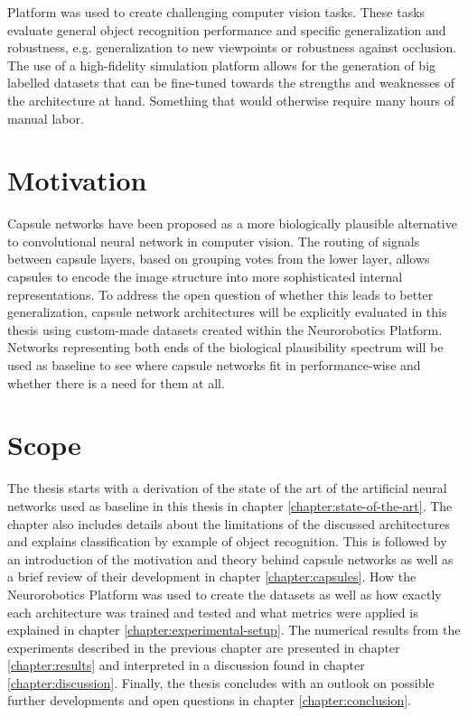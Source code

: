 Platform was used to create challenging computer vision tasks. These tasks evaluate general object recognition performance and specific generalization and robustness, e.g. generalization to new viewpoints or robustness against occlusion. The use of a high-fidelity simulation platform allows for the generation of big labelled datasets that can be fine-tuned towards the strengths and weaknesses of the architecture at hand. Something that would otherwise require many hours of manual labor.
\section{Motivation}
Capsule networks have been proposed as a more biologically plausible alternative to convolutional neural network in computer vision. The routing of signals between capsule layers, based on grouping votes from the lower layer, allows capsules to encode the image structure into more sophisticated internal representations. To address the open question of whether this leads to better generalization, capsule network architectures will be explicitly evaluated in this thesis using custom-made datasets created within the Neurorobotics Platform. Networks representing both ends of the biological plausibility spectrum will be used as baseline to see where capsule networks fit in performance-wise and whether there is a need for them at all.
\section{Scope}
The thesis starts with a derivation of the state of the art of the artificial neural networks used as baseline in this thesis in chapter \ref{chapter:state-of-the-art}. The chapter also includes details about the limitations of the discussed architectures and explains classification by example of object recognition. This is followed by an introduction of the motivation and theory behind capsule networks as well as a brief review of their development in chapter \ref{chapter:capsules}. How the Neurorobotics Platform was used to create the datasets as well as how exactly each architecture was trained and tested and what metrics were applied is explained in chapter \ref{chapter:experimental-setup}. The numerical results from the experiments described in the previous chapter are presented in chapter \ref{chapter:results} and interpreted in a discussion found in chapter \ref{chapter:discussion}. Finally, the thesis concludes with an outlook on possible further developments and open questions in chapter \ref{chapter:conclusion}.

